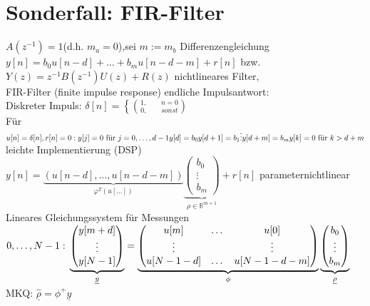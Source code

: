 \documentclass[ngerman]{tudscrreprt}
\begin{document}
\section{Sonderfall: FIR-Filter}
$A(z^{-1})=1$\quad (d.h. $m_a = 0$),sei $m:=m_b$ Differenzengleichung\\
$y[n] = b_0 u[n-d] + \dots + b_m u[n-d-m] + r[n]$ bzw. $Y(z) = z^{-1} B(z^{-1})U(z) + R(z)$ nichtlineares Filter,\\
FIR-Filter (finite impulse response) endliche Impulsantwort: \\
Diskreter Impuls: $\delta [n] = \left\{\binom{1,\qquad n= 0}{0, \qquad sonst}\right.$
\\Für $u[n]= \delta[n], r[n]= 0: \\ y[j]= 0 \text{ für } j=0,\dots, d-1 \\
y[d] = b_0\\
y[d+1] = b_1\\
\vdots\\
y[d+m] = b_m\\
y[k] = 0 \text{ für } k>d+m
$
leichte Implementierung (DSP) \\
$y[n] = \underbrace{(u[n-d],\dots, u[n-d-m])}_{\varphi^T(u[\dots])}\underbrace{\begin{pmatrix}b_0\\ \vdots \\ b_m \end{pmatrix}}_{\rho \in \mathbb{R}^{m+1}} + r[n]$ parameternichtlinear\\
Lineares Gleichungssystem für Messungen $0,\dots,N-1:\\
\underbrace{\begin{pmatrix} y[m+d]\\\vdots\\y[N-1]\end{pmatrix}}_{\underline{y}} = 
\underbrace{
	\begin{pmatrix}
	u[m] &\dots & u[0]\\
	\vdots&& \vdots\\
	u[N-1-d]&\dots&u[N-1-d-m]
	\end{pmatrix}
}_{\phi}\underbrace{
\begin{pmatrix}
b_0\\\vdots\\b_m
\end{pmatrix}}_{\underline{\rho}}
$\qquad MKQ: $\hat{\underline{\rho}} = \phi^+ \underline y$
\end{document}
